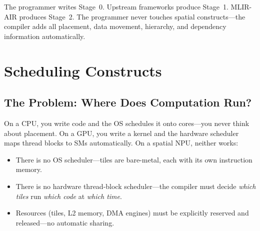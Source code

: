 \documentclass[11pt,a4paper]{article}
\begin{document}
\begin{center}
\end{center}

The programmer writes Stage~0. Upstream frameworks produce Stage~1. MLIR-AIR
produces Stage~2. The programmer never touches spatial constructs---the compiler
adds all placement, data movement, hierarchy, and dependency information
automatically.


\section{Scheduling Constructs}

\subsection{The Problem: Where Does Computation Run?}

On a CPU, you write code and the OS schedules it onto cores---you never think about
placement. On a GPU, you write a kernel and the hardware scheduler maps thread blocks
to SMs automatically. On a spatial NPU, neither works:

\begin{itemize}[leftmargin=2em]
  \item There is no OS scheduler---tiles are bare-metal, each with its own instruction
    memory.
  \item There is no hardware thread-block scheduler---the compiler must decide
    \emph{which tiles} run \emph{which code} at \emph{which time}.
  \item Resources (tiles, L2 memory, DMA engines) must be explicitly reserved and
    released---no automatic sharing.
\end{itemize}
\end{document}
